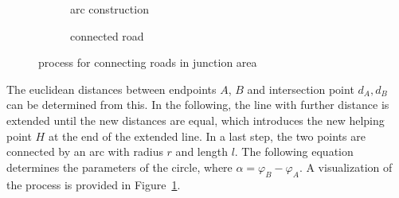 \documentclass[a4paper, 10pt, conference]{ieeeconf}      %
\begin{document}
\begin{figure}[!h]
\begin{subfigure}{0.32\columnwidth}
        \caption{arc construction}
        \end{subfigure}
        \begin{subfigure}{0.32\columnwidth}
            \vspace{1cm}
        \caption{connected road}
        \end{subfigure}
        \caption{process for connecting roads in junction area}
        \label{fig_connecting_road}
    \end{figure}


    The euclidean distances between endpoints \(A\), \(B\) and intersection point \(d_A, d_B\) can be determined from this. In the following, the line with further distance is extended until the new distances are equal, which introduces the new helping point \(H\) at the end of the extended line. In a last step, the two points are connected by an arc with radius \(r\) and length \(l\). The following equation determines the parameters of the circle, where \(\alpha = \varphi_B - \varphi_A\). A visualization of the process is provided in Figure~\ref{fig_connecting_road}.
\end{document}
